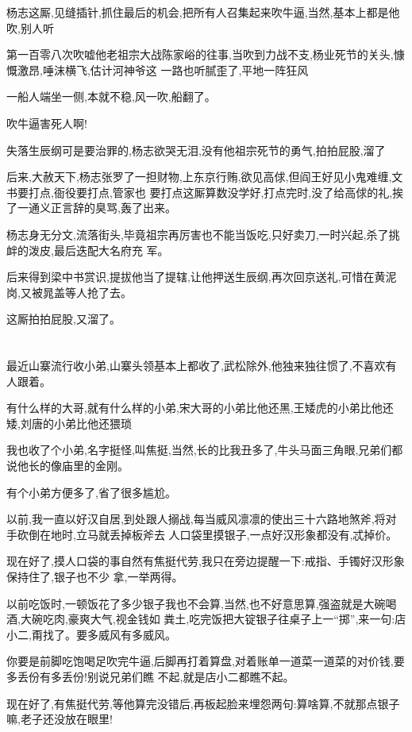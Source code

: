 ﻿\documentclass[12pt]{article}
\begin{document}
杨志这厮,见缝插针,抓住最后的机会,把所有人召集起来吹牛逼,当然,基本上都是他吹,别人听

第一百零八次吹嘘他老祖宗大战陈家峪的往事,当吹到力战不支,杨业死节的关头,慷慨激昂,唾沫横飞,估计河神爷这
一路也听腻歪了,平地一阵狂风

一船人端坐一侧,本就不稳,风一吹,船翻了。

吹牛逼害死人啊!

失落生辰纲可是要治罪的,杨志欲哭无泪,没有他祖宗死节的勇气,拍拍屁股,溜了

后来,大赦天下,杨志张罗了一担财物,上东京行贿,欲见高俅,但阎王好见小鬼难缠,文书要打点,衙役要打点,管家也
要打点\dldots 这厮算数没学好,打点完时,没了给高俅的礼,挨了一通义正言辞的臭骂,轰了出来。

杨志身无分文,流落街头,毕竟祖宗再厉害也不能当饭吃,只好卖刀,一时兴起,杀了挑衅的泼皮,最后迭配大名府充
军。

后来得到梁中书赏识,提拔他当了提辖,让他押送生辰纲,再次回京送礼,可惜在黄泥岗,又被晁盖等人抢了去。

这厮拍拍屁股,又溜了。

\section{}

最近山寨流行收小弟,山寨头领基本上都收了,武松除外,他独来独往惯了,不喜欢有人跟着。

有什么样的大哥,就有什么样的小弟,宋大哥的小弟比他还黑,王矮虎的小弟比他还矮,刘唐的小弟比他还猥琐

我也收了个小弟,名字挺怪,叫焦挺,当然,长的比我丑多了,牛头马面三角眼,兄弟们都说他长的像庙里的金刚。

有个小弟方便多了,省了很多尴尬。

以前,我一直以好汉自居,到处跟人搦战,每当威风凛凛的使出三十六路地煞斧,将对手砍倒在地时,立马就丢掉板斧去
人口袋里摸银子,一点好汉形象都没有,忒掉价。

现在好了,摸人口袋的事自然有焦挺代劳,我只在旁边提醒一下:戒指、手镯\dldots 好汉形象保持住了,银子也不少
拿,一举两得。

以前吃饭时,一顿饭花了多少银子我也不会算,当然,也不好意思算,强盗就是大碗喝酒,大碗吃肉,豪爽大气,视金钱如
粪土,吃完饭把大锭银子往桌子上一``掷'',来一句:店小二,甭找了。要多威风有多威风。

你要是前脚吃饱喝足吹完牛逼,后脚再打着算盘,对着账单一道菜一道菜的对价钱,要多丢份有多丢份!别说兄弟们瞧
不起,就是店小二都瞧不起。

现在好了,有焦挺代劳,等他算完没错后,再板起脸来埋怨两句:算啥算,不就那点银子嘛,老子还没放在眼里!
\end{document}

